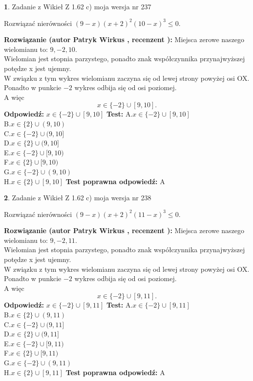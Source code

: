 \documentclass[12pt, a4paper]{article}
\theoremstyle{definition} %
\newtheorem{zad}{}
\newcommand{\zadStart}[1]{\begin{zad}#1\newline}
\newcommand{\zadStop}{\end{zad}}
\newcommand{\rozwStart}[2]{\noindent \textbf{Rozwiązanie (autor #1 , recenzent #2): }\newline}
\newcommand{\rozwStop}{\newline}
\newcommand{\odpStart}{\noindent \textbf{Odpowiedź:}\newline}
\newcommand{\odpStop}{\newline}
\newcommand{\testStart}{\noindent \textbf{Test:}\newline}
\newcommand{\testStop}{\newline}
\newcommand{\kluczStart}{\noindent \textbf{Test poprawna odpowiedź:}\newline}
\newcommand{\kluczStop}{\newline}
\begin{document}
\zadStart{Zadanie z Wikieł Z 1.62 c) moja wersja nr 237}

Rozwiązać nierówności $(9-x)(x+2)^{2}(10-x)^{3}\le0$.
\zadStop
\rozwStart{Patryk Wirkus}{}
Miejsca zerowe naszego wielomianu to: $9, -2, 10$.\\
Wielomian jest stopnia parzystego, ponadto znak współczynnika przy\linebreak najwyższej potędze x jest ujemny.\\ W związku z tym wykres wielomianu zaczyna się od lewej strony powyżej osi OX.\\
Ponadto w punkcie $-2$ wykres odbija się od osi poziomej.\\
A więc $$x \in \{-2\} \cup [9,10].$$
\rozwStop
\odpStart
$x \in \{-2\} \cup [9,10]$
\odpStop
\testStart
A.$x \in \{-2\} \cup [9,10]$\\
B.$x \in \{2\} \cup (9,10)$\\
C.$x \in \{-2\} \cup (9,10]$\\
D.$x \in \{2\} \cup (9,10]$\\
E.$x \in \{-2\} \cup [9,10)$\\
F.$x \in \{2\} \cup [9,10)$\\
G.$x \in \{-2\} \cup (9,10)$\\
H.$x \in \{2\} \cup [9,10]$
\testStop
\kluczStart
A
\kluczStop



\zadStart{Zadanie z Wikieł Z 1.62 c) moja wersja nr 238}

Rozwiązać nierówności $(9-x)(x+2)^{2}(11-x)^{3}\le0$.
\zadStop
\rozwStart{Patryk Wirkus}{}
Miejsca zerowe naszego wielomianu to: $9, -2, 11$.\\
Wielomian jest stopnia parzystego, ponadto znak współczynnika przy\linebreak najwyższej potędze x jest ujemny.\\ W związku z tym wykres wielomianu zaczyna się od lewej strony powyżej osi OX.\\
Ponadto w punkcie $-2$ wykres odbija się od osi poziomej.\\
A więc $$x \in \{-2\} \cup [9,11].$$
\rozwStop
\odpStart
$x \in \{-2\} \cup [9,11]$
\odpStop
\testStart
A.$x \in \{-2\} \cup [9,11]$\\
B.$x \in \{2\} \cup (9,11)$\\
C.$x \in \{-2\} \cup (9,11]$\\
D.$x \in \{2\} \cup (9,11]$\\
E.$x \in \{-2\} \cup [9,11)$\\
F.$x \in \{2\} \cup [9,11)$\\
G.$x \in \{-2\} \cup (9,11)$\\
H.$x \in \{2\} \cup [9,11]$
\testStop
\kluczStart
A
\kluczStop
\end{document}
